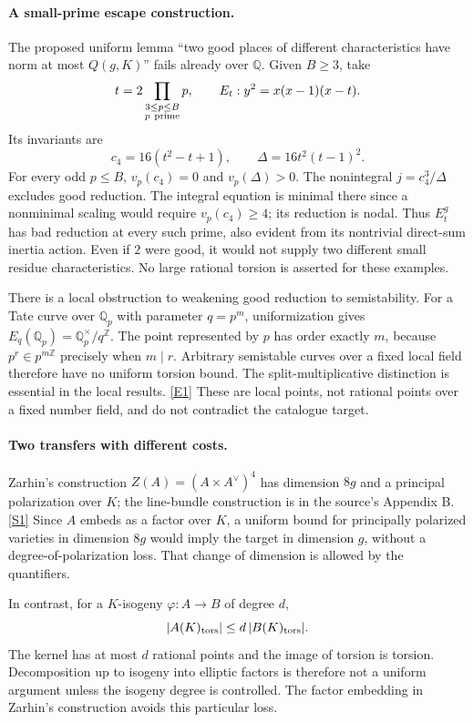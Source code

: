 \documentclass[11pt,a4paper]{article}
\newcommand{\Z}{\mathbb{Z}}
\newcommand{\Q}{\mathbb{Q}}
\newcommand{\sref}[2]{\hyperlink{source:#1:#2}{[S#2]}}
\newcommand{\eref}[2]{\hyperlink{extra:#1:#2}{[E#2]}}
\numberwithin{equation}{section}
\begin{document}
\paragraph{A small-prime escape construction.}
The proposed uniform lemma ``two good places of different characteristics
have norm at most $Q(g,K)$'' fails already over $\Q$. Given $B\ge3$, take
\[
 t=2\prod_{\substack{3\le p\le B\\p\ {\rm prime}}}p,
 \qquad E_t:y^2=x(x-1)(x-t).
\]
Its invariants are
\[
 c_4=16(t^2-t+1),\qquad \Delta=16t^2(t-1)^2.
\]
For every odd $p\le B$, $v_p(c_4)=0$ and $v_p(\Delta)>0$. The nonintegral
$j=c_4^3/\Delta$ excludes good reduction. The integral equation is minimal
there since a nonminimal scaling would require $v_p(c_4)\ge4$; its reduction
is nodal. Thus $E_t^g$ has bad reduction at every such prime, also evident
from its nontrivial direct-sum inertia action. Even if $2$ were good, it
would not supply two different small residue characteristics. No large
rational torsion is asserted for these examples.

There is a local obstruction to weakening good reduction to semistability.
For a Tate curve over $\Q_p$ with parameter $q=p^m$, uniformization gives
$E_q(\Q_p)=\Q_p^\times/q^{\Z}$. The point represented by $p$ has order exactly
$m$, because $p^r\in p^{m\Z}$ precisely when $m\mid r$. Arbitrary
semistable curves over a fixed local field therefore have no uniform torsion
bound. The split-multiplicative distinction is essential in the local
results. \eref{30006748}{1} These are local points, not rational points over a
fixed number field, and do not contradict the catalogue target.

\paragraph{Two transfers with different costs.}
Zarhin's construction $Z(A)=(A\times A^\vee)^4$ has dimension $8g$ and a
principal polarization over $K$; the line-bundle construction is in the
source's Appendix B. \sref{30006748}{1} Since $A$ embeds as a factor over $K$,
a uniform bound for principally polarized varieties in dimension $8g$
would imply the target in dimension $g$, without a degree-of-polarization
loss. That change of dimension is allowed by the quantifiers.

In contrast, for a $K$-isogeny $\varphi:A\to B$ of degree $d$,
\[
 |A(K)_{\rm tors}|\le d\,|B(K)_{\rm tors}|.
\]
The kernel has at most $d$ rational points and the image of torsion is
torsion. Decomposition up to isogeny into elliptic factors is therefore not
a uniform argument unless the isogeny degree is controlled. The factor
embedding in Zarhin's construction avoids this particular loss.
\end{document}
